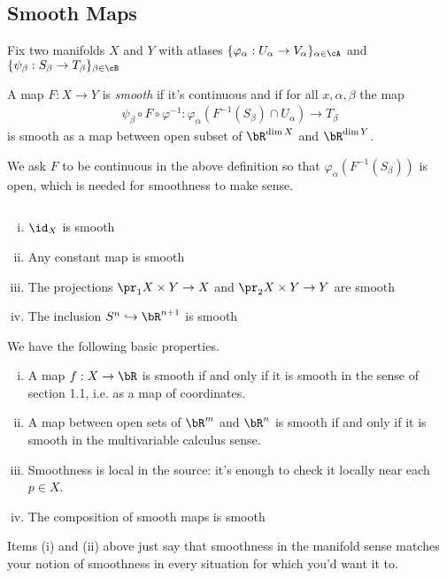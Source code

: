 
\subsection{Smooth Maps}
Fix two manifolds $X$ and $Y$ with atlases $\{\varphi_\alpha:U_\alpha\to V_\alpha\}_{\alpha \in \cA}$ and $\{\psi_\beta:S_\beta\to T_\beta\}_{\beta\in \cB}$

\begin{defn}\label{defn:smooth-map}
	A map $F:X\to Y$ is \emph{smooth} if it's continuous and if for all $x,\alpha,\beta$ the map 
	\begin{align*}
		\psi_\beta\circ F\circ \varphi^{-1}: \varphi_\alpha \left(F^{-1}(S_\beta) \cap U_\alpha\right) \to T_\beta
	\end{align*}
	is smooth as a map between open subset of $\bR^{\dim X}$ and $\bR^{\dim Y}$.
\end{defn}
\begin{rmk}\label{rmk:why-cts-needed}
	We ask $F$ to be continuous in the above definition so that $\varphi_\alpha \left(F^{-1}(S_\beta)\right)$ is open, which is needed for smoothness to make sense.
\end{rmk}

\begin{example}$ $
	\begin{enumerate}[(i)]
		\item $\id_X$ is smooth
		\item Any constant map is smooth
		\item The projections $\pr_1X\times Y \to X$ and $\pr_2X\times Y \to Y$ are smooth
		\item The inclusion $S^n \hookrightarrow \bR^{n+1}$ is smooth
	\end{enumerate}
\end{example}

\begin{lem}\label{lem:basic-smoothness-properties}
	We have the following basic properties.
	\begin{enumerate}[(i)]
		\item A map $f:X\to \bR$ is smooth if and only if it is smooth in the sense of section 1.1, i.e. as a map of coordinates.
		\item A map between open sets of $\bR^m$ and $\bR^n$ is smooth if and only if it is smooth in the multivariable calculus sense.
		\item Smoothness is local in the source: it's enough to check it locally near each $p \in X$.
		\item The composition of smooth maps is smooth
	\end{enumerate}
\end{lem}
Items (i) and (ii) above just say that smoothness in the manifold sense matches your notion of smoothness in every situation for which you'd want it to.

